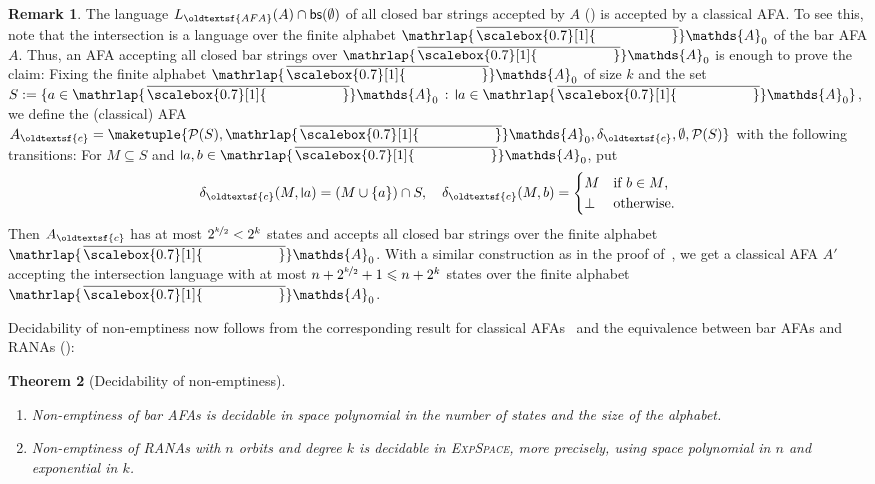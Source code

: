 \documentclass[10pt,a4paper]{amsart}
\newtheorem{theo}{Theorem}[section]
\theoremstyle{definition}
\newtheorem{rem}[theo]{Remark}
\renewcommand{\textsf}[1]{{\oldtextsf{\small#1}}}
\newcommand{\seq}{\subseteq}
\newcommand{\At}{\mathds{A}}
\newcommand{\bars}{\mathsf{bs}}
\newcommand{\names}{\At}
\newcommand{\pow}{\mathcal{P}}
\newcommand{\set}[1]{\{#1\}}
\newcommand{\setw}[2]{\{#1\,:\,#2\}}
\newcommand{\mybar}[3]{%
  \mathrlap{\hspace{#2}\overline{\scalebox{#1}[1]{\phantom{\ensuremath{#3}}}}}\ensuremath{#3}
}
\newcommand{\barNames}{{\mybar{0.7}{1.25pt}{\names}}}
\newcommand{\midmid}{\hspace{0.2ex}{\rule[-0.1ex]{0.6pt}{1.65ex}}\hspace{0.2ex}}
\newcommand{\newletter}[1]{{\midmid}#1}
\newcommand{\EXPSPACE}{\textsc{ExpSpace}\xspace}
\begin{document}
\begin{rem}\label{rem:fixAFA}
  The language $L_{\textsf{\scriptsize AFA}}(A) \cap \bars(\emptyset)$ of all closed bar
  strings accepted by $A$ () is accepted by a classical AFA. To see
  this, note that the intersection is a language over the finite alphabet $\barNames_0$ of the
  bar AFA $A$. Thus, an AFA accepting all closed bar strings over $\barNames_0$ is enough to
  prove the claim: Fixing the finite alphabet $\barNames_0$ of size $k$ and the set
  $S := \setw{a \in \barNames_0}{\newletter{a} \in \barNames_0}$, we define the (classical) AFA
  $A_{\textsf{\scriptsize c}} = \maketuple{\pow(S), \barNames_0, \delta_{\textsf{\scriptsize
        c}}, \emptyset, \pow(S)}$ with the following transitions: For $M \seq S$ and
  $\newletter{a}, b \in \barNames_0$, put
  \[
    \delta_{\textsf{\scriptsize c}}(M, \newletter{a}) = (M \cup \set{a}) \cap S, \quad
    \delta_{\textsf{\scriptsize c}}(M, b)
    =
    \begin{cases}
      M & \text{if $b \in M$,} \\
      \bot & \text{otherwise.}
    \end{cases}
  \]
  Then  
  $A_{\textsf{\scriptsize c}}$ has at most $2^{\nicefrac{k}{2}} < 2^k$ states and accepts all closed bar strings over the finite alphabet $\barNames_0$. 
  With a similar construction as in the proof of~, we get a classical AFA $A'$ accepting
  the intersection language with at most $n + 2^{\nicefrac{k}{2}} + 1 \leqslant n + 2^k$ states over the finite
  alphabet $\barNames_0$.
\end{rem}

Decidability of non-emptiness now follows from the corresponding result for classical AFAs~\cite[Thm.~3.1]{jr91}
and the equivalence between bar AFAs and RANAs ():


\begin{theo}[Decidability of non-emptiness]
  \label{thm:decneRANA}
  \begin{enumerate}%
    \item Non-emptiness of bar AFAs is decidable
      in space polynomial in the number of states and the size of the alphabet.
    \item Non-emptiness of RANAs with $n$ orbits and degree $k$ 
      is decidable in \EXPSPACE, more precisely, using space polynomial in $n$
      and exponential in $k$.
  \end{enumerate}
\end{theo}
\end{document}
